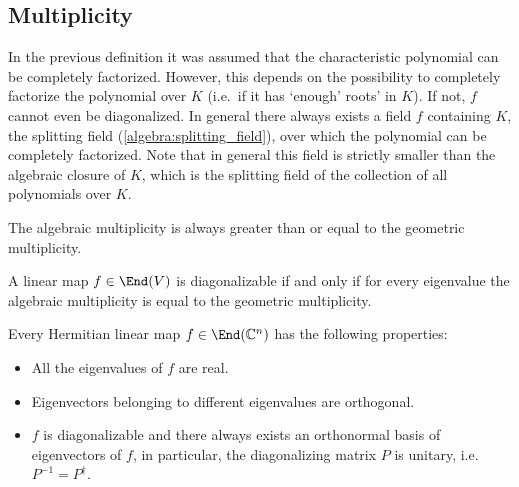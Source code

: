 \subsection{Multiplicity}

    \begin{remark}
        In the previous definition it was assumed that the characteristic polynomial can be completely factorized. However, this depends on the possibility to completely factorize the polynomial over $K$ (i.e.~if it has `enough' roots' in $K$). If not, $f$ cannot even be diagonalized. In general there always exists a field $f$ containing $K$, the splitting field (\cref{algebra:splitting_field}), over which the polynomial can be completely factorized. Note that in general this field is strictly smaller than the algebraic closure of $K$, which is the splitting field of the collection of all polynomials over $K$.
    \end{remark}

    \begin{property}
        The algebraic multiplicity is always greater than or equal to the geometric multiplicity.
    \end{property}
    \begin{theorem}\label{linalgebra:diagonalizable_multiplicity}
        A linear map $f\in\End(V)$ is diagonalizable if and only if for every eigenvalue the algebraic multiplicity is equal to the geometric multiplicity.
    \end{theorem}

    \begin{property}\label{linalgebra:diagonalizable_hermitian}
        Every Hermitian linear map $f\in\End(\mathbb{C}^n)$ has the following properties:
        \begin{itemize}
            \item All the eigenvalues of $f$ are real.
            \item Eigenvectors belonging to different eigenvalues are orthogonal.
            \item $f$ is diagonalizable and there always exists an orthonormal basis of eigenvectors of $f$, in particular, the diagonalizing matrix $P$ is unitary, i.e.~$P^{-1} = P^\dag$.
        \end{itemize}
    \end{property}


